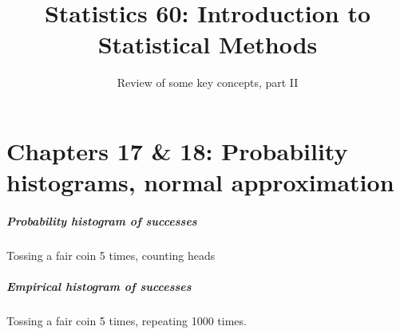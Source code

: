\documentclass[handout]{beamer}
\title{Statistics 60: Introduction to Statistical Methods}
\subtitle{Review of some key concepts, part II}
\author{}%
\begin{document}
   \begin{frame}
   \titlepage
   \end{frame}

   \part{Chapters 17 \& 18: Probability histograms, normal approximation}
   \frame{\partpage}



   \begin{frame}
   \frametitle{Probability histogram of successes}
   \begin{center}
   \end{center}
   Tossing a fair coin 5 times, counting heads
   \end{frame}



   \begin{frame}
   \frametitle{Empirical histogram of successes}
   \begin{center}
   \end{center}
   Tossing a fair coin 5 times, repeating 1000 times.
   \end{frame}

\end{document}
